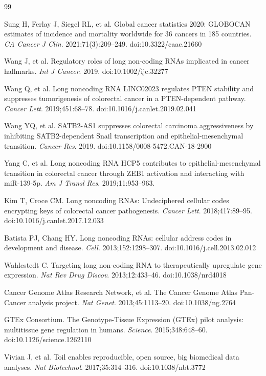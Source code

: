 \documentclass[12pt,a4paper]{article}
\begin{document}
\begin{thebibliography}{99}
\raggedright

 Sung H, Ferlay J, Siegel RL, et al. Global cancer statistics 2020: GLOBOCAN estimates of incidence and mortality worldwide for 36 cancers in 185 countries. \textit{CA Cancer J Clin}. 2021;71(3):209--249. doi:10.3322/caac.21660

 Wang J, et al. Regulatory roles of long non-coding RNAs implicated in cancer hallmarks. \textit{Int J Cancer}. 2019. doi:10.1002/ijc.32277

 Wang Q, et al. Long noncoding RNA LINC02023 regulates PTEN stability and suppresses tumorigenesis of colorectal cancer in a PTEN-dependent pathway. \textit{Cancer Lett}. 2019;451:68--78. doi:10.1016/j.canlet.2019.02.041

 Wang YQ, et al. SATB2-AS1 suppresses colorectal carcinoma aggressiveness by inhibiting SATB2-dependent Snail transcription and epithelial-mesenchymal transition. \textit{Cancer Res}. 2019. doi:10.1158/0008-5472.CAN-18-2900

 Yang C, et al. Long noncoding RNA HCP5 contributes to epithelial-mesenchymal transition in colorectal cancer through ZEB1 activation and interacting with miR-139-5p. \textit{Am J Transl Res}. 2019;11:953--963.

 Kim T, Croce CM. Long noncoding RNAs: Undeciphered cellular codes encrypting keys of colorectal cancer pathogenesis. \textit{Cancer Lett}. 2018;417:89--95. doi:10.1016/j.canlet.2017.12.033

 Batista PJ, Chang HY. Long noncoding RNAs: cellular address codes in development and disease. \textit{Cell}. 2013;152:1298--307. doi:10.1016/j.cell.2013.02.012

 Wahlestedt C. Targeting long non-coding RNA to therapeutically upregulate gene expression. \textit{Nat Rev Drug Discov}. 2013;12:433--46. doi:10.1038/nrd4018

 Cancer Genome Atlas Research Network, et al. The Cancer Genome Atlas Pan-Cancer analysis project. \textit{Nat Genet}. 2013;45:1113--20. doi:10.1038/ng.2764

 GTEx Consortium. The Genotype-Tissue Expression (GTEx) pilot analysis: multitissue gene regulation in humans. \textit{Science}. 2015;348:648--60. doi:10.1126/science.1262110

 Vivian J, et al. Toil enables reproducible, open source, big biomedical data analyses. \textit{Nat Biotechnol}. 2017;35:314--316. doi:10.1038/nbt.3772


\end{thebibliography}
\end{document}
